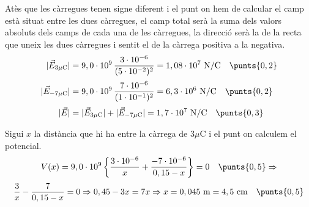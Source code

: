 \begin{solapartat}
Atès que les càrregues tenen signe diferent i el punt on hem de calcular el camp està situat entre les dues càrregues, el camp total serà la suma dels valors absoluts dels camps de cada una de les càrregues, la direcció serà la de la recta que uneix les dues càrregues i sentit el de la càrrega positiva a la negativa. 
\begin{align*}
|\vec{E}_{3\mu\mathrm{C}}| &= 9,0\cdot 10^{9}\,\frac{3\cdot 10^{-6}}{(5\cdot 10^{-2})^2} = 1,08\cdot 10^{7}\ \mathrm{N/C} \quad\punts{0,2}\\[2pt]
|\vec{E}_{-7\mu\mathrm{C}}| &= 9,0\cdot 10^{9}\,\frac{7\cdot 10^{-6}}{(1\cdot 10^{-1})^2} = 6,3\cdot 10^{6}\ \mathrm{N/C} \quad\punts{0,2}\\[2pt]
|\vec{E}| &= |\vec{E}_{3\mu\mathrm{C}}| + |\vec{E}_{-7\mu\mathrm{C}}| = 1,7\cdot 10^{7}\ \mathrm{N/C} \quad\punts{0,3}
\end{align*}
\end{solapartat}

\begin{solapartat}
Sigui $x$ la distància que hi ha entre la càrrega de $3\mu\mathrm{C}$ i el punt on calculem el potencial.
\[ V(x) = 9,0\cdot 10^{9}\left\{\frac{3\cdot 10^{-6}}{x} + \frac{-7\cdot 10^{-6}}{0,15 - x}\right\} = 0 \quad\punts{0,5} \Rightarrow \]
\[ \frac{3}{x} - \frac{7}{0,15 - x} = 0 \Rightarrow 0,45 - 3x = 7x \Rightarrow x = 0,045\ \mathrm{m} = 4,5\ \mathrm{cm} \quad\punts{0,5} \]
\end{solapartat}
